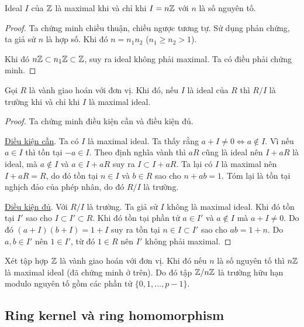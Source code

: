 \begin{corollary}
    Ideal $I$ của $\mathbb{Z}$ là maximal khi và chỉ khi $I = n\mathbb{Z}$ với $n$ là số nguyên tố.
\end{corollary}

\begin{proof}
    Ta chứng minh chiều thuận, chiều ngược tương tự. Sử dụng phản chứng,
    ta giả sử $n$ là hợp số. Khi đó $n = n_1 n_2$ ($n_1 \geq n_2 > 1$).

    Khi đó $n \mathbb{Z} \subset n_1 \mathbb{Z} \subset \mathbb{Z}$, suy ra ideal không phải
    maximal. Ta có điều phải chứng minh.
\end{proof}

\begin{theorem}
    Gọi $R$ là vành giao hoán với đơn vị. Khi đó, nếu $I$ là ideal của $R$ thì $R / I$ là trường khi và chỉ khi $I$ là maximal ideal.
\end{theorem}

\begin{proof}
    Ta chứng minh điều kiện cần và điều kiện đủ.

    \underline{Điều kiện cần}. Ta có $I$ là maximal ideal. Ta thấy rằng
    $a + I \neq 0 \Leftrightarrow a \not\in I$. Vì nếu $a \in I$ thì 
    tồn tại $-a \in I$. Theo định nghĩa vành thì $a R$ cũng là ideal
    nên $I + a R$ là ideal, mà $a \not\in I$ và $a \in I + a R$ suy ra
    $I \subset I + a R$. Ta lại có $I$ là maximal nên $I + aR = R$, 
    do đó tồn tại $n \in I$ và $b \in R$ sao cho $n + ab = 1$. Tóm 
    lại là tồn tại nghịch đảo của phép nhân, do đó $R / I$ là trường.
    
    \underline{Điều kiện đủ}. Với $R / I$ là trường. Ta giả sử $I$ không là
    maximal ideal. Khi đó tồn tại $I'$ sao cho $I \subset I' \subset R$.
    Khi đó tồn tại phần tử $a \in I'$ và $a \not\in I$ mà $a + I \neq 0$.
    Do đó $(a + I) (b + I) = 1 + I$ suy ra tồn tại $n \in I \subset I'$ 
    sao cho $a b = 1 + n$. Do $a, b \in I'$ nên $1 \in I'$, từ đó
    $1 \in R$ nên $I'$ không phải maximal.
\end{proof}

\begin{example}
    Xét tập hợp $\mathbb{Z}$ là vành giao hoán với đơn vị. Khi đó nếu $n$ là số nguyên tố thì $n \mathbb{Z}$ là maximal ideal (đã chứng minh ở trên). Do đó tập $\mathbb{Z} / n\mathbb{Z}$ là trường hữu hạn modulo nguyên tố gồm các phần tử $\{ 0, 1, \ldots, p-1 \}$.
\end{example}

\subsection*{Ring kernel và ring homomorphism}

